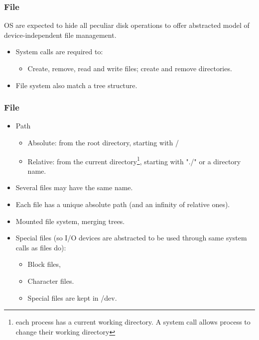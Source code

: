   \begin{frame}
    \frametitle{File}
    OS are expected to hide all peculiar disk operations to offer abstracted model of device-independent file management.
      \begin{itemize}
        \item System calls are required to:
        \begin{itemize}
          \item Create, remove, read and write files; create and remove directories.
        \end{itemize}
        \item File system also match a tree structure.
      \end{itemize}
  \end{frame}
  \begin{frame}
    \frametitle{File}
      \begin{itemize}
        \item Path
          \begin{itemize}
            \item Absolute: from the root directory, starting with /
            \item Relative: from the current directory\footnote{each process has a current working directory. A system call allows process to change their working directory}, starting with "./" or a directory name.
          \end{itemize}
        \item Several files may have the same name.
        \item Each file has a unique absolute path (and an infinity of relative ones).
        \item Mounted file system, merging trees.
        \item Special files (so I/O devices are abstracted to be used through same system calls as files do):
          \begin{itemize}
            \item Block files,
            \item Character files.
            \item Special files are kept in /dev.
          \end{itemize}
      \end{itemize}
  \end{frame}

